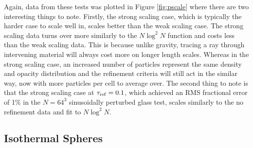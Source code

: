\documentclass[fleq,usenatbib]{mnras}
\newcommand{\tr}{\tau_{\rm ref}}
\begin{document}
Again, data from these tests was plotted in Figure \ref{fig:pscale} where 
there are two interesting things to note. Firstly, the strong scaling case, 
which is typically the harder case to scale well in, scales better than the 
weak scaling case. The strong scaling data turns over more similarly to the
$N\log^2{N}$ function and costs less than the weak scaling data. This is 
because unlike gravity, tracing a ray through intervening material will always 
cost more on longer length scales. Whereas in the strong scaling case, an 
increased number of particles represent the same density and opacity 
distribution and the refinement criteria will still act in the similar way, 
now with more particles per cell to average over. The second thing to note is 
that the strong scaling case at $\tr=0.1$, which achieved an RMS fractional 
error of 1\% in the $N=64^3$ sinusoidally perturbed glass test, scales 
similarly to the no refinement data and fit to $N\log^2{N}$. 

\subsection{Isothermal Spheres}
\end{document}
